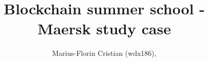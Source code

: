 \documentclass[a4paper]{article}
\begin{document}
\title{\vspace{-4cm}Blockchain summer school - Maersk study case}
\author{Marius-Florin Cristian (wdx186), }

\maketitle




\end{document}

